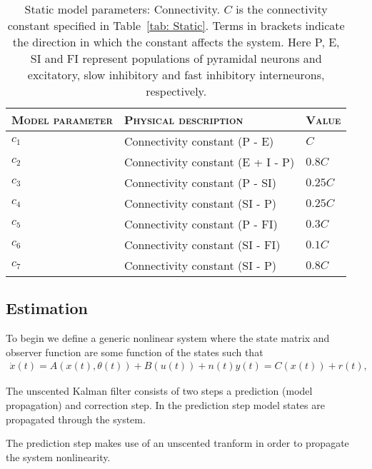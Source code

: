 \begin{center}
	\begin{table}
			\caption[Static Model Parameters: Connectivity]{Static model parameters: Connectivity. $C$ is the connectivity constant specified in Table~\ref{tab: Static}. Terms in brackets indicate the direction in which the constant affects the system. Here P, E, SI and FI represent populations of pyramidal neurons and excitatory, slow inhibitory and fast inhibitory interneurons, respectively.}
		\begin{tabular}{||p{4cm}|p{7cm}|p{2cm}||}\hline
			 \textsc{Model parameter}  & \textsc{Physical description} & \textsc{Value}
			   \\\hline\hline
			 $c_{1}$ & Connectivity constant (P - E) & $C$ \\\hline
			 $c_{2}$ & Connectivity constant (E + I - P) & $0.8C$ \\\hline
			 $c_{3}$ & Connectivity constant (P - SI) & $0.25C$  \\\hline
			 $c_{4}$ & Connectivity constant (SI - P)& $0.25C$ \\\hline
			 $c_{5}$ & Connectivity constant (P - FI) & $0.3C$ \\\hline
			 $c_{6}$ & Connectivity constant (SI - FI) & $0.1C$ \\\hline
			 $c_{7}$ & Connectivity constant (SI - P) & $0.8C$ \\\hline\hline
		\end{tabular}
		\label{tab: Connectivity}
	\end{table}
\end{center}

\subsection{Estimation}

To begin we define a generic nonlinear system where the state matrix and observer function are some function of the states such that \begin{align}
\dot{x}(t) = A(x(t),\theta(t)) + B(u(t)) + n(t)
y(t)  = C(x(t)) +r(t),
\end{align}

The unscented Kalman filter consists of two steps a prediction (model propagation) and correction step. In the prediction step model states are propagated through the system.

The prediction step makes use of an unscented tranform in order to propagate the system nonlinearity.

